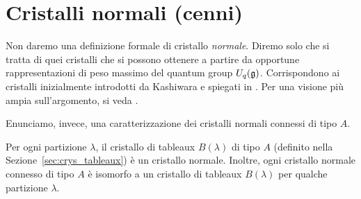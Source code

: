 % 
% 
% 

\section{Cristalli normali (cenni)}
\label{sec:crys_norm}

Non daremo una definizione formale di cristallo \emph{normale}.
Diremo solo che si tratta di quei cristalli che si possono ottenere a partire da
opportune rappresentazioni di peso massimo del quantum group $U_q(\mathfrak{g})$.
Corrispondono ai cristalli inizialmente introdotti da Kashiwara e spiegati in
\cite{kashiwara1995crystal}.
Per una visione pi\`u ampia sull'argomento, si veda 
\cite[Section~5.7]{bump-schilling-17}.

Enunciamo, invece, una caratterizzazione dei cristalli normali connessi di tipo $A$.

\begin{theorem}
    Per ogni partizione $\lambda$, il cristallo di tableaux $B(\lambda)$ di tipo $A$
    (definito nella Sezione~\ref{sec:crys_tableaux})
    \`e un cristallo normale.
    Inoltre, ogni cristallo normale connesso di tipo $A$ \`e isomorfo a un
    cristallo di tableaux $B(\lambda)$ per qualche partizione $\lambda$.
\end{theorem}

